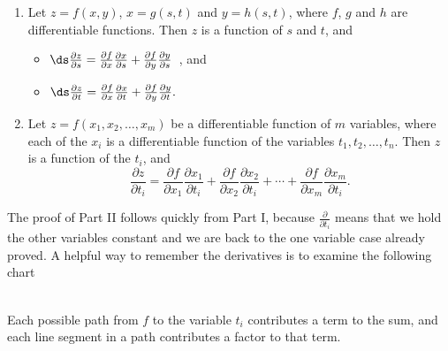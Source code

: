 {\begin{enumerate}
	\item Let $z=f(x,y)$, $x=g(s,t)$ and $y=h(s,t)$, where $f$, $g$ and $h$ are differentiable functions. Then $z$ is a function of $s$ and $t$, and
		\begin{itemize}
			\item $\ds \frac{\partial z}{\partial s} = \frac{\partial f}{\partial x}\frac{\partial x}{\partial s} + \frac{\partial f}{\partial y}\frac{\partial y}{\partial s}$\ , \quad and 
			\item $\ds \frac{\partial z}{\partial t} = \frac{\partial f}{\partial x}\frac{\partial x}{\partial t} + \frac{\partial f}{\partial y}\frac{\partial y}{\partial t}.$
		\end{itemize}
		
		\item		Let $z = f(x_1,x_2,\ldots,x_m)$ be a differentiable function of $m$ variables, where each of the $x_i$ is a differentiable function of the variables $t_1,t_2,\ldots,t_n$. Then $z$ is a function of the $t_i$, and 
		\[\frac{\partial z}{\partial t_i} = \frac{\partial f}{\partial x_1}\frac{\partial x_1}{\partial t_i} + \frac{\partial f}{\partial x_2}\frac{\partial x_2}{\partial t_i} + \cdots +  \frac{\partial f}{\partial x_m}\frac{\partial x_m}{\partial t_i}.\]
\end{enumerate}}

The proof of Part II follows quickly from Part I, because $\frac\partial{\partial t_i}$ means that we hold the other variables constant and we are back to the one variable case already proved.  A helpful way to remember the derivatives is to examine the following chart\\
\begin{lxfigure}\centering
{}
\end{lxfigure}\\
Each possible path from $f$ to the variable $t_i$ contributes a term to the sum, and each line segment in a path contributes a factor to that term.

